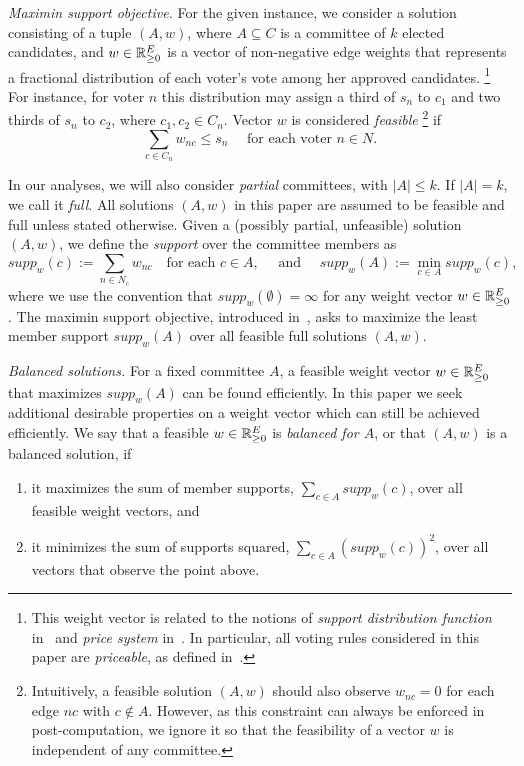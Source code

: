 \emph{Maximin support objective.} 
For the given instance, we consider a solution consisting of a tuple $(A,w)$, where $A\subseteq C$ is a committee of $k$ elected candidates, and $w\in\mathbb{R}_{\geq 0}^E$ is a vector of non-negative edge weights that represents a fractional distribution of each voter's vote among her approved candidates.%
\footnote{This weight vector is related to the notions of \emph{support distribution function} in~\cite{sanchez2016maximin} and \emph{price system} in~\cite{peters2019proportionality}. In particular, all voting rules considered in this paper are \emph{priceable}, as defined in~\cite{peters2019proportionality}.} 
For instance, for voter $n$ this distribution may assign a third of $s_n$ to $c_1$ and two thirds of $s_n$ to $c_2$, where $c_1, c_2\in C_n$.
Vector $w$ is considered \emph{feasible}%
\footnote{Intuitively, a feasible solution $(A,w)$ should also observe $w_{nc}=0$ for each edge $nc$ with $c\not\in A$. 
However, as this constraint can always be enforced in post-computation, we ignore it so that the feasibility of a vector $w$ is independent of any committee.} 
if  %
%
\begin{equation}
    \sum_{c\in C_n} w_{nc}\leq s_n \quad \text{ for each voter } n\in N. \label{eq:feasible}
\end{equation}

In our analyses, we will also consider \emph{partial} committees, with $|A|\leq k$. If $|A|=k$, we call it \emph{full}. 
All solutions $(A,w)$ in this paper are assumed to be feasible and full unless stated otherwise. 
Given a (possibly partial, unfeasible) solution $(A,w)$, we define the \emph{support} over the committee members as 
\begin{equation}
supp_w(c):=\sum_{n\in N_c} w_{nc} \quad \text{for each $c\in A, \quad$ and } \quad supp_w(A):=\min_{c\in A} supp_w(c), \label{eq:support}
\end{equation}
where we use the convention that $supp_w(\emptyset)=\infty$ for any weight vector $w\in\mathbb{R}_{\geq 0}^E$. 
The maximin support objective, introduced in~\cite{sanchez2016maximin}, asks to maximize the least member support $supp_w(A)$ over all feasible full solutions $(A,w)$. 

\emph{Balanced solutions.}
For a fixed committee $A$, a feasible weight vector $w\in\mathbb{R}_{\geq 0}^E$ that maximizes $supp_w(A)$ can be found efficiently. In this paper we seek additional desirable properties on a weight vector which can still be achieved efficiently. We say that a feasible $w\in\mathbb{R}_{\geq 0}^E$ is \emph{balanced for $A$}, or that $(A,w)$ is a balanced solution, if
\begin{enumerate}
    \item it maximizes the sum of member supports, $\sum_{c\in A} supp_w(c)$, over all feasible weight vectors, and 
    \item it minimizes the sum of supports squared, $\sum_{c\in A} (supp_w(c))^2$, over all vectors that observe the point above. 
\end{enumerate}

